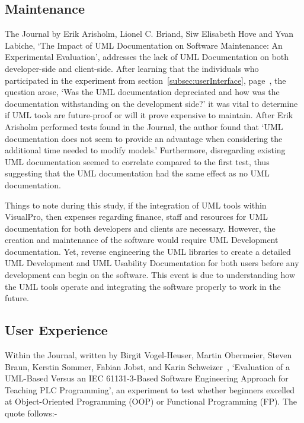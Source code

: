 \documentclass[12pt]{report} %
\begin{document}
		\subsection{Maintenance}
		\label{subsec:maintenance}
			The Journal by Erik Arisholm, Lionel C. Briand, Siw Elisabeth Hove and Yvan Labiche, `The Impact of UML Documentation on Software Maintenance: An Experimental Evaluation', addresses the lack of UML Documentation on both developer-side and client-side. After learning that the individuals who participated in the experiment from section~\ref{subsec:userInterface}, page~\pageref{subsec:userInterface}, the question arose, `Was the UML documentation depreciated and how was the documentation withstanding on the development side?' it was vital to determine if UML tools are future-proof or will it prove expensive to maintain. After Erik Arisholm performed tests found in the Journal, the author found that `UML documentation does not seem to provide an advantage when considering the additional time needed to modify models.' Furthermore, disregarding existing UML documentation seemed to correlate compared to the first test, thus suggesting that the UML documentation had the same effect as no UML documentation.

			Things to note during this study, if the integration of UML tools within VisualPro, then expenses regarding finance, staff and resources for UML documentation for both developers and clients are necessary. However, the creation and maintenance of the software would require UML Development documentation. Yet, reverse engineering the UML libraries to create a detailed UML Development and UML Usability Documentation for both users before any development can begin on the software. This event is due to understanding how the UML tools operate and integrating the software properly to work in the future.

		\subsection{User Experience}
		\label{subsec:userExperience}
			Within the Journal, written by Birgit Vogel-Heuser, Martin Obermeier, Steven Braun, Kerstin Sommer, Fabian Jobst, and Karin Schweizer~\cite{vogel-heuser_evaluation_2013}, `Evaluation of a UML-Based Versus an IEC 61131-3-Based Software Engineering Approach for Teaching PLC Programming', an experiment to test whether beginners excelled at Object-Oriented Programming (OOP) or Functional Programming (FP). The quote follows:-
\end{document}
